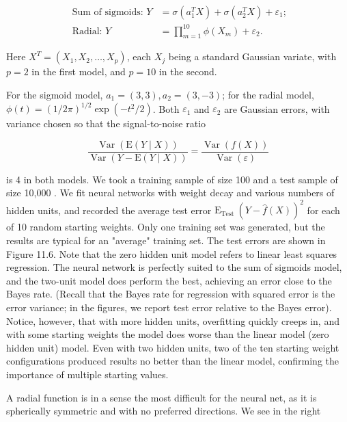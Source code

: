 \documentclass[10pt]{article}
\begin{document}
$$
\begin{aligned}
\text { Sum of sigmoids: } Y & =\sigma\left(a_{1}^{T} X\right)+\sigma\left(a_{2}^{T} X\right)+\varepsilon_{1} ; \\
\text { Radial: } Y & =\prod_{m=1}^{10} \phi\left(X_{m}\right)+\varepsilon_{2} .
\end{aligned}
$$

Here $X^{T}=\left(X_{1}, X_{2}, \ldots, X_{p}\right)$, each $X_{j}$ being a standard Gaussian variate, with $p=2$ in the first model, and $p=10$ in the second.

For the sigmoid model, $a_{1}=(3,3), a_{2}=(3,-3)$; for the radial model, $\phi(t)=(1 / 2 \pi)^{1 / 2} \exp \left(-t^{2} / 2\right)$. Both $\varepsilon_{1}$ and $\varepsilon_{2}$ are Gaussian errors, with variance chosen so that the signal-to-noise ratio


\begin{equation*}
\frac{\operatorname{Var}(\mathrm{E}(Y \mid X))}{\operatorname{Var}(Y-\mathrm{E}(Y \mid X))}=\frac{\operatorname{Var}(f(X))}{\operatorname{Var}(\varepsilon)} \tag{11.18}
\end{equation*}


is 4 in both models. We took a training sample of size 100 and a test sample of size 10,000 . We fit neural networks with weight decay and various numbers of hidden units, and recorded the average test error $\mathrm{E}_{\text {Test }}(Y-\hat{f}(X))^{2}$ for each of 10 random starting weights. Only one training set was generated, but the results are typical for an "average" training set. The test errors are shown in Figure 11.6. Note that the zero hidden unit model refers to linear least squares regression. The neural network is perfectly suited to the sum of sigmoids model, and the two-unit model does perform the best, achieving an error close to the Bayes rate. (Recall that the Bayes rate for regression with squared error is the error variance; in the figures, we report test error relative to the Bayes error). Notice, however, that with more hidden units, overfitting quickly creeps in, and with some starting weights the model does worse than the linear model (zero hidden unit) model. Even with two hidden units, two of the ten starting weight configurations produced results no better than the linear model, confirming the importance of multiple starting values.

A radial function is in a sense the most difficult for the neural net, as it is spherically symmetric and with no preferred directions. We see in the right
\end{document}
